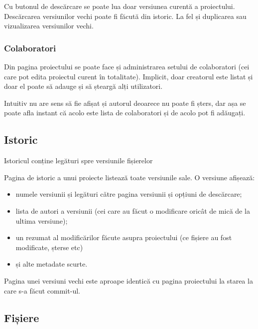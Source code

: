 \documentclass[a4wide,12pt]{report}
\newcommand{\eng}[1]{{#1}} %
\begin{document}
Cu butonul de descărcare se poate lua doar versiunea curentă a proiectului.
Descărcarea versiunilor vechi poate fi făcută din istoric. La fel și duplicarea
sau vizualizarea versiunilor vechi.

\subsubsection{Colaboratori}

Din pagina proiectului se poate face și administrarea setului de colaboratori
(cei care pot edita proiectul curent în totalitate). Implicit, doar creatorul
este listat și doar el poate să adauge și să șteargă alți utilizatori.

Intuitiv nu are sens să fie afișat și autorul deoarece nu poate fi șters, dar
așa se poate afla instant că acolo este lista de colaboratori și de acolo pot fi
adăugați.

\subsection{Istoric}

Istoricul conține legături spre versiunile fișierelor

Pagina de istoric a unui proiecte listează toate versiunile sale. O versiune
afișează:

\begin{itemize}

\item numele versiunii și legături către pagina versiunii și opțiuni de
descărcare;

\item lista de autori a versiunii (cei care au făcut o modificare oricât de mică
de la ultima versiune);

\item un rezumat al modificărilor făcute asupra proiectului (ce fișiere au fost
modificate, șterse etc)

\item și alte metadate scurte.

\end{itemize}

Pagina unei versiuni vechi este aproape identică cu pagina proiectului la
starea la care s-a făcut \eng{commit}-ul.

\subsection{Fișiere}
\end{document}
